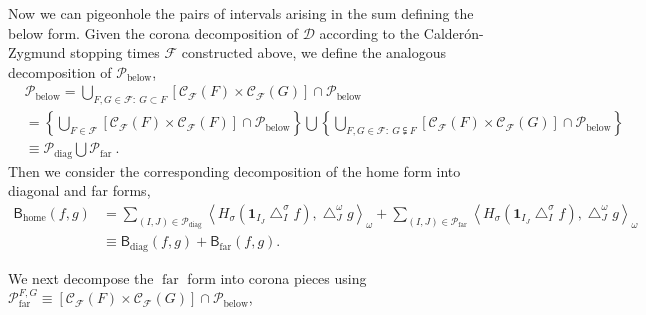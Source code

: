 \documentclass{amsart}%
\theoremstyle{plain}
\numberwithin{equation}{section}
\begin{document}
Now we can pigeonhole the pairs of intervals arising in the sum defining the
below form. Given the corona decomposition of $\mathcal{D}$ according to the
Calder\'{o}n-Zygmund stopping times $\mathcal{F}$ constructed above, we define
the analogous decomposition of $\mathcal{P}_{\operatorname{below}}$,%
\begin{align*}
& \mathcal{P}_{\operatorname{below}}=\bigcup_{F,G\in\mathcal{F}:\ G\subset
F}\left[  \mathcal{C}_{\mathcal{F}}\left(  F\right)  \times\mathcal{C}%
_{\mathcal{F}}\left(  G\right)  \right]  \cap\mathcal{P}_{\operatorname{below}%
}\\
& =\left\{  \bigcup_{F\in\mathcal{F}}\left[  \mathcal{C}_{\mathcal{F}}\left(
F\right)  \times\mathcal{C}_{\mathcal{F}}\left(  F\right)  \right]
\cap\mathcal{P}_{\operatorname{below}}\right\}  \bigcup\left\{  \bigcup
_{F,G\in\mathcal{F}:\ G\subsetneqq F}\left[  \mathcal{C}_{\mathcal{F}}\left(
F\right)  \times\mathcal{C}_{\mathcal{F}}\left(  G\right)  \right]
\cap\mathcal{P}_{\operatorname{below}}\right\} \\
& \equiv\mathcal{P}_{\operatorname{diag}}\bigcup\mathcal{P}%
_{\operatorname{far}}\ .
\end{align*}
Then we consider the corresponding decomposition of the home form into
diagonal and far forms,%
\begin{align*}
\mathsf{B}_{\operatorname{home}}\left(  f,g\right)   & =\sum_{\left(
I,J\right)  \in\mathcal{P}_{\operatorname{diag}}}\left\langle H_{\sigma
}\left(  \mathbf{1}_{I_{J}}\bigtriangleup_{I}^{\sigma}f\right)
,\bigtriangleup_{J}^{\omega}g\right\rangle _{\omega}+\sum_{\left(  I,J\right)
\in\mathcal{P}_{\operatorname{far}}}\left\langle H_{\sigma}\left(
\mathbf{1}_{I_{J}}\bigtriangleup_{I}^{\sigma}f\right)  ,\bigtriangleup
_{J}^{\omega}g\right\rangle _{\omega}\\
& \equiv\mathsf{B}_{\operatorname{diag}}\left(  f,g\right)  +\mathsf{B}%
_{\operatorname{far}}\left(  f,g\right)  .
\end{align*}


We next decompose the $\operatorname{far}$ form into corona pieces using
$\mathcal{P}_{\operatorname{far}}^{F,G}\equiv\left[  \mathcal{C}_{\mathcal{F}%
}\left(  F\right)  \times\mathcal{C}_{\mathcal{F}}\left(  G\right)  \right]
\cap\mathcal{P}_{\operatorname{below}}$,%
\end{document}
